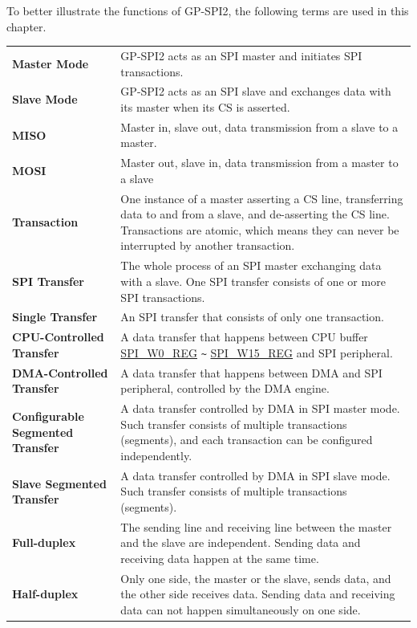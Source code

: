 To better illustrate the functions of GP-SPI2, the following terms are used in this chapter.

\begin{longtable}[c]{ R{7cm} p{10cm} }

\textbf{Master Mode}     & GP-SPI2 acts as an SPI master and initiates SPI transactions. \\
\textbf{Slave Mode}      & GP-SPI2 acts as an SPI slave and exchanges data with its master when its CS is asserted.\\
\textbf{MISO}       & Master in, slave out, data transmission from a slave to a master.\\
\textbf{MOSI}  & Master out, slave in, data transmission from a master to a slave \\
\textbf{Transaction} & One instance of a master asserting a CS line, transferring data to and from a slave, and de-asserting the CS line. Transactions are atomic, which means they can never be interrupted by another transaction.\\
\textbf{SPI Transfer} & The whole process of an SPI master exchanging data with a slave. One SPI transfer consists of one or more SPI transactions.\\
\textbf{Single Transfer} & An SPI transfer that consists of only one transaction. \\
\textbf{CPU-Controlled Transfer}& A data transfer that happens between CPU buffer \hyperref[regdesc:SPIW0REG]{SPI\_W0\_REG} \verb+~+ \hyperref[regdesc:SPIW0REG]{SPI\_W15\_REG} and SPI peripheral.\\
\textbf{DMA-Controlled Transfer}& A data transfer that happens between DMA and SPI peripheral, controlled by the DMA engine.\\
\textbf{Configurable Segmented Transfer}& A data transfer controlled by DMA in SPI master mode. Such transfer consists of multiple transactions (segments), and each transaction can be configured independently.\\
\textbf{Slave Segmented Transfer} & A data transfer controlled by DMA in SPI slave mode. Such transfer consists of multiple transactions (segments).\\
\textbf{Full-duplex} & The sending line and receiving line between the master and the slave are independent. Sending data and receiving data happen at the same time. \\
\textbf{Half-duplex} & Only one side, the master or the slave, sends data, and the other side receives data. Sending data and receiving data can not happen simultaneously on one side.\\

\end{longtable}
